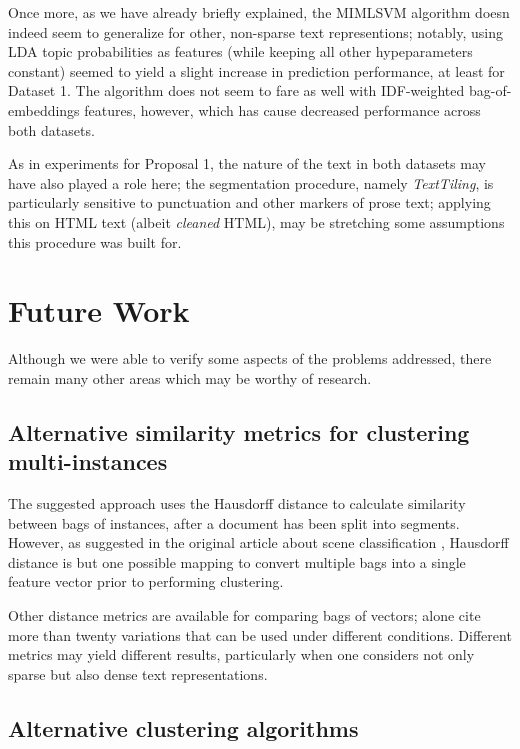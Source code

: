 Once more, as we have already briefly explained, the MIMLSVM algorithm \citep{shen_etal_2009} doesn indeed seem to generalize for other, non-sparse text representions; notably, using LDA topic probabilities as features (while keeping all other hypeparameters constant) seemed to yield a slight increase in prediction performance, at least for Dataset 1. The algorithm does not seem to fare as well with IDF-weighted bag-of-embeddings features, however, which has cause decreased performance across both datasets.

As in experiments for Proposal 1, the nature of the text in both datasets may have also played a role here; the segmentation procedure, namely \textit{TextTiling}, is particularly sensitive to punctuation and other markers of prose text; applying this on HTML text (albeit \textit{cleaned} HTML), may be stretching some assumptions this procedure was built for.


\section{Future Work}

Although we were able to verify some aspects of the problems addressed, there remain many other areas which may be worthy of research.

\subsection{Alternative similarity metrics for clustering multi-instances}

The suggested approach uses the Hausdorff distance to calculate similarity between bags of instances, after a document has been split into segments. However, as suggested in the original article about scene classification \citep{zhou_zhang_2006}, Hausdorff distance is but one possible mapping to convert multiple bags into a single feature vector prior to performing clustering. 

Other distance metrics are available for comparing bags of vectors; \cite{huttenlocher_etal_1993} alone cite more than twenty variations that can be used under different conditions. Different metrics may yield different results, particularly when one considers not only sparse but also dense text representations.

\subsection{Alternative clustering algorithms}

